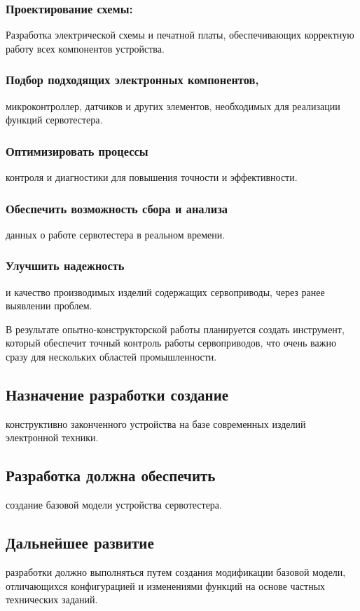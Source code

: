 \documentclass[a4paper]{bsuir-tor}
\begin{document}
  \subsubsection{Проектирование схемы: }
  Разработка электрической схемы и печатной платы, обеспечивающих
  корректную работу всех компонентов устройства.

  \subsubsection{Подбор подходящих электронных компонентов, }
  микроконтроллер, датчиков и других элементов, необходимых для
  реализации функций сервотестера.

  \subsubsection{Оптимизировать процессы}
  контроля и диагностики для повышения точности и эффективности.
  
  \subsubsection{Обеспечить возможность сбора и анализа}
  данных о работе сервотестера в реальном времени.

  \subsubsection{Улучшить надежность}
  и качество производимых изделий содержащих сервоприводы,
  через ранее выявлении проблем.

  В результате опытно-конструкторской работы планируется
  создать инструмент, который обеспечит точный контроль
  работы сервоприводов, что очень важно
  сразу для нескольких областей промышленности.

  \subsection{ Назначение разработки создание }
  конструктивно законченного
  устройства на базе современных изделий электронной техники.

  \subsection{ Разработка должна обеспечить }
  создание базовой модели устройства сервотестера.

  \subsection{ Дальнейшее развитие}
  разработки должно выполняться путем создания модификации базовой
  модели, отличающихся конфигурацией и изменениями функций на
  основе частных технических заданий.
\end{document}
